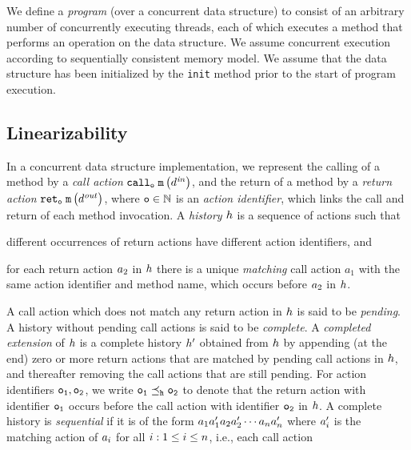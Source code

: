We define a {\em program} (over a concurrent data structure) to consist 
of an arbitrary number of concurrently executing threads, each of which
executes a method that performs an operation on the data structure.
We assume concurrent execution according to sequentially consistent memory
model.
We assume that the data structure has been initialized
by the {\tt init} method prior to the start of program execution.

\subsection{Linearizability}
In a concurrent
data structure implementation, we represent the calling of a method by
a {\it call action} $\mathtt{call}_{\tt o}\; {\tt m}\left(d^{\it in}\right)$, and the return of a method by
a {\it return action} $\mathtt{ret}_{\tt o}\; {\tt m}\left(d^{\it out}\right)$, where $\tt o\in\mathbb{N}$ is an
{\it action identifier}, which links the call and return of each method invocation.
%
A {\it history} $h$ is a sequence of actions such that
\begin{inparaenum}[(i)]
\item
  different occurrences of return actions have different action identifiers, and
\item
  for each return action $a_2$ in $h$ there is a unique
{\it matching}  call action $a_1$ with the same action identifier and method name, which occurs before $a_2$ in $h$.
\end{inparaenum}
%
A call action which does not match any return action in $h$ is said
to be {\em pending}.
A history without pending call actions is said to be {\em complete}.
A {\em completed extension} of $h$ is a complete history
$h'$ obtained from $h$ by
  appending (at the end) zero or more return actions that are matched by
  pending call actions in $h$, and
  thereafter removing the call actions that are still pending.
%
For action identifiers $\tt o_1,\tt o_2$, we write
$\tt o_1\preceq_{h}\tt o_2$ to denote that
the return action with identifier $\tt o_1$ occurs before
the call action with identifier $\tt o_2$ in $h$.
A complete history is {\it sequential} if it is of the form
$a_1a'_1a_2a'_2\cdots a_na'_n$
where $a'_i$ is the matching action of $a_i$ 
for all $i:1\leq i\leq n$, i.e., each call action 
